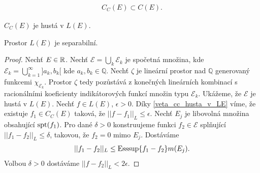 \begin{poznamka}
\begin{align*}
C_C(E) \subset C(E).
\end{align*}
\end{poznamka}

\begin{theorem}
$C_C(E)$ je hustá v $L(E)$.
\label{veta_cc_husta_v_LE}
\end{theorem}


\begin{definition}
\end{definition}

\begin{theorem}
Prostor  $L(E)$ je separabilní.
\end{theorem}

\begin{proof}
Nechť $E \in \mathbb{R}$. Nechť $\mathcal{E}=\bigcup \limits _{k} \mathcal{E}_k$ je spočetná množina, kde $\mathcal{E}_k=\bigcup \limits _{k=1}^{\infty}]a_k,b_k[$ kde $a_k,b_k \in \mathbb{Q}$. Nechť $\zeta$ je lineární prostor nad $\mathbb{Q}$ generovaný funkcemi $\chi_{\mathcal{E}_k}$. Prostor $\zeta$ tedy pozůstává z konečných lineárních kombinací s racionálními koeficienty indikátorových funkcí množin typu $\mathcal{E}_k$.
Ukážeme, že $\mathcal{E}$ je hustá v $L(E)$. Nechť $f \in L(E)$, $\epsilon > 0$. Díky \ref{veta_cc_husta_v_LE} víme, že existuje $f_1 \in C_C(E)$ taková, že $||f-f_1||_L \leq \epsilon$. Nechť $E_j$ je libovolná množina obsahující $\operatorname{spt}(f_1)$. Pro dané $\delta>0$ konstruujeme funkci $f_2 \in \mathcal{E}$ splňující $||f_1-f_2||_L \leq \delta$, takovou, že $f_2=0$ mimo $E_j$. Dostáváme
\begin{align*}
||f_1-f_2||_L \leq \operatorname{Esssup}\{f_1-f_2\} m(E_j).
\end{align*}
Volbou $\delta>0$ dostáváme $||f-f_2||_L< 2 \epsilon$.
\end{proof}





